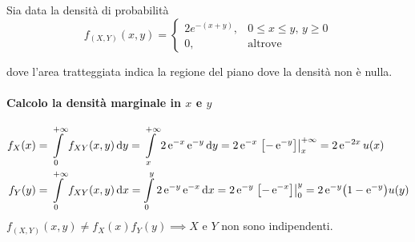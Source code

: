 \begin{esempio}
Sia data la densità di probabilità
\[
	f_{(X,Y)} (x,y) = \begin{cases}
		2e^{-(x+y)}, & 0 \leq x \leq y,\, y \geq 0 \\
		0, & \text{altrove}
	\end{cases}
\]
\begin{center}\end{center}
dove l'area tratteggiata indica la regione del piano dove la densità non è nulla.

\paragraph{Calcolo la densità marginale in $x$ e $y$}
\begin{align*}
	f_X (x) &= \intd{0}{+\infty}{f_{XY} (x,y)}{y} =
		\intd{x}{+\infty}{2 \e{-x} \e{-y}}{y} =
		2\e{-x} \bound{x}{+\infty}{-\e{-y}} =
		2\e{-2x} u(x) \\
	f_Y (y) &= \intd{0}{+\infty}{f_{XY} (x,y)}{x} =
		\intd{0}{y}{2 \e{-y} \e{-x}}{x} =
		2\e{-y} \bound{0}{y}{-\e{-x}} =
		2\e{-y} \bigl(1 - \e{-y}\bigr) u(y)
\end{align*}
$f_{(X,Y)}(x,y) \neq f_X (x) f_Y (y) \implies X$ e $Y$ non sono indipendenti.


\end{esempio}
